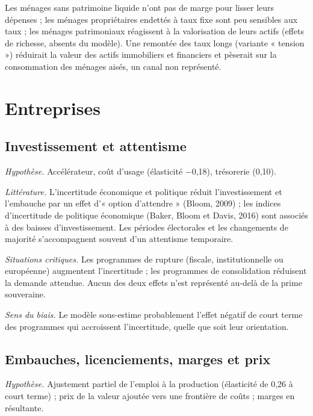 \documentclass[
  11pt,
  11pt,
  a4paper,
  openany]{book}
\begin{document}
Les ménages sans patrimoine liquide n'ont pas de marge pour lisser leurs
dépenses ; les ménages propriétaires endettés à taux fixe sont peu
sensibles aux taux ; les ménages patrimoniaux réagissent à la
valorisation de leurs actifs (effets de richesse, absents du modèle).
Une remontée des taux longs (variante « tension ») réduirait la valeur
des actifs immobiliers et financiers et pèserait sur la consommation des
ménages aisés, un canal non représenté.

\hypertarget{entreprises}{%
\section{Entreprises}\label{entreprises}}

\hypertarget{investissement-et-attentisme}{%
\subsection{Investissement et
attentisme}\label{investissement-et-attentisme}}

\emph{Hypothèse.} Accélérateur, coût d'usage (élasticité −0,18),
trésorerie (0,10).

\emph{Littérature.} L'incertitude économique et politique réduit
l'investissement et l'embauche par un effet d'« option d'attendre »
(Bloom, 2009) ; les indices d'incertitude de politique économique
(Baker, Bloom et Davis, 2016) sont associés à des baisses
d'investissement. Les périodes électorales et les changements de
majorité s'accompagnent souvent d'un attentisme temporaire.

\emph{Situations critiques.} Les programmes de rupture (fiscale,
institutionnelle ou européenne) augmentent l'incertitude ; les
programmes de consolidation réduisent la demande attendue. Aucun des
deux effets n'est représenté au-delà de la prime souveraine.

\emph{Sens du biais.} Le modèle sous-estime probablement l'effet négatif
de court terme des programmes qui accroissent l'incertitude, quelle que
soit leur orientation.

\hypertarget{embauches-licenciements-marges-et-prix}{%
\subsection{Embauches, licenciements, marges et
prix}\label{embauches-licenciements-marges-et-prix}}

\emph{Hypothèse.} Ajustement partiel de l'emploi à la production
(élasticité de 0,26 à court terme) ; prix de la valeur ajoutée vers une
frontière de coûts ; marges en résultante.
\end{document}
